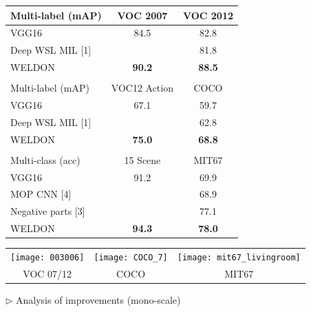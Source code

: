 \documentclass[landscape,a0paper,fontscale=0.292]{baposter}
\begin{document}
\begin{poster}
{\begin{minipage}[t]{8cm}
\begin{tabular}{|l|c|c|}
\cline{2-3}
\multicolumn{1}{l|}{Multi-label (mAP)}	& VOC 2007 	& VOC 2012 \\
\hline
VGG16 			& 84.5 	& 82.8 	\\
Deep WSL MIL [1]		&  	& 81.8 	\\
\hline
WELDON			& \textbf{90.2} & \textbf{88.5} \\
\hline
\multicolumn{3}{c}{} \vspace{-3.5mm} \\
\cline{2-3}
\multicolumn{1}{l|}{Multi-label (mAP)}	& VOC12 Action 	& COCO\\
\hline
VGG16 			& 67.1	& 59.7 \\
Deep WSL MIL [1] 		&  & 62.8 \\
\hline
WELDON			& \textbf{75.0}	& \textbf{68.8} \\
\hline
\multicolumn{3}{c}{} \vspace{-3.5mm} \\
\cline{2-3}
\multicolumn{1}{l|}{Multi-class (acc)}	& 15 Scene 		& MIT67 \\
\hline
VGG16  			& 91.2	& 69.9 	\\
MOP CNN [4]		&	& 68.9	\\
Negative parts [3]		&	& 77.1 	\\
\hline
WELDON 		& \textbf{94.3} 	& \textbf{78.0} \\
\hline
\end{tabular}

\end{minipage} \hfill 
\begin{minipage}[t]{8cm}

\vspace{-3mm}

\begin{tabular}{ccc}
 \texttt{[image: 003006]} & \hspace{-4mm}
 \texttt{[image: COCO\_7]} & \hspace{-4mm}
 \texttt{[image: mit67\_livingroom]}
 \\
 VOC 07/12 & \hspace{-4mm} COCO & \hspace{-4mm} MIT67 
\end{tabular}

$\triangleright$ Analysis of improvements (mono-scale)


\end{minipage}}
\end{poster}
\end{document}
